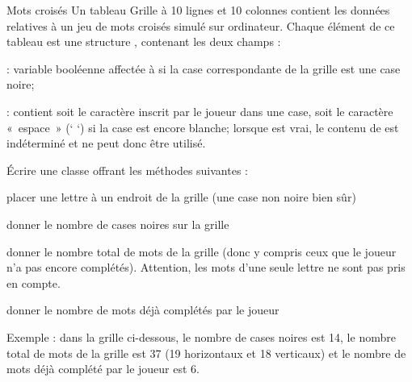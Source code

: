 \begin{Exercice}{Mots croisés}
	Un tableau Grille à 10 lignes et 10 colonnes contient les données
	relatives à un jeu de mots croisés simulé sur ordinateur. Chaque
	élément de ce tableau est une structure ,
	contenant les deux champs :

	\begin{liste}
		\item 
			 : variable booléenne affectée à
			 si la case correspondante de la grille est une
			case noire;
		\item 
			 : contient soit le caractère inscrit par le
			joueur dans une case, soit le caractère «~espace~» (‘ ‘) si la case est
			encore blanche; lorsque  est vrai, le contenu
			de  est indéterminé et ne peut donc être
			utilisé. 
	\end{liste}
	
	Écrire une classe  offrant les méthodes
	suivantes :

	\begin{liste}
		\item 
			placer une lettre à un endroit de la grille (une case non noire bien
			sûr)
		\item 
			donner le nombre de cases noires sur la grille
		\item 
			donner le nombre total de mots de la grille (donc y compris ceux que le
			joueur n’a pas encore complétés). Attention, les mots
			d'une seule lettre ne sont pas pris en compte.
		\item 
			donner le nombre de mots déjà complétés par le joueur
	\end{liste}

	Exemple : dans la grille ci-dessous, le nombre de cases noires est 14, le
	nombre total de mots de la grille est 37 (19 horizontaux et 18
	verticaux) et le nombre de mots déjà complété par le joueur est 6.
	

\end{Exercice}

